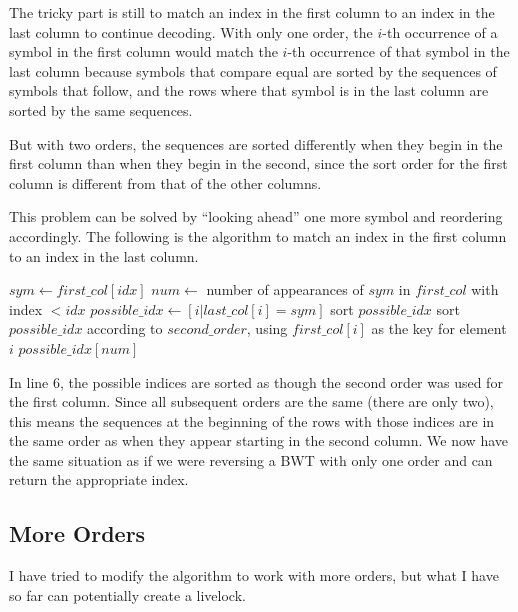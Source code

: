 \documentclass[a4paper]{scrreprt}
\begin{document}
The tricky part is still to match an index in the first column to an index in
the last column to continue decoding. With only one order, the \(i\)-th
occurrence of a symbol in the first column would match the \(i\)-th occurrence
of that symbol in the last column because symbols that compare equal are sorted
by the sequences of symbols that follow, and the rows where that symbol is in
the last column are sorted by the same sequences.

But with two orders, the sequences are sorted differently when they begin in the
first column than when they begin in the second, since the sort order for the
first column is different from that of the other columns.

This problem can be solved by ``looking ahead'' one more symbol and reordering
accordingly. The following is the algorithm to match an index in the first
column to an index in the last column.

\begin{algorithm}
\begin{algorithmic}[1]
\State $sym \gets first\_col[idx]$
\State $num \gets$ number of appearances of $sym$ in $first\_col$ with index $<
idx$
\State $possible\_idx \gets [i | last\_col[i] = sym]$
\State sort $possible\_idx$
\State sort $possible\_idx$ according to $second\_order$, using $first\_col[i]$
as the key for element $i$
\State \Return $possible\_idx[num]$
\EndProcedure
\end{algorithmic}
\end{algorithm}

In line 6, the possible indices are sorted as though the second order was used
for the first column. Since all subsequent orders are the same (there are only
two), this means the sequences at the beginning of the rows with those indices
are in the same order as when they appear starting in the second column. We now
have the same situation as if we were reversing a BWT with only one order and
can return the appropriate index.

\subsection{More Orders}

I have tried to modify the algorithm to work with more orders, but what I have
so far can potentially create a livelock.
\end{document}
